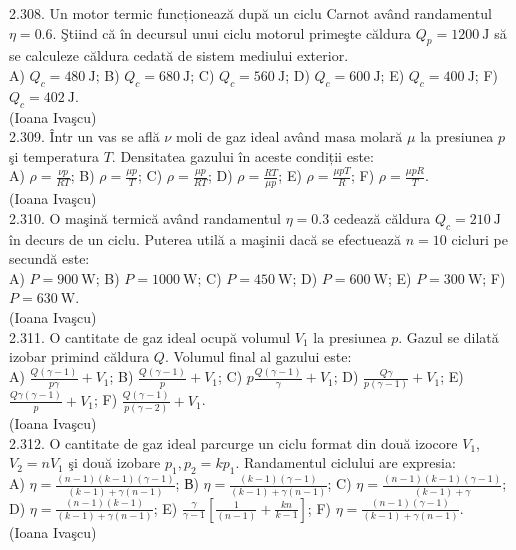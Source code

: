 \documentclass[10pt]{article}
\begin{document}
2.308. Un motor termic funcționează după un ciclu Carnot având randamentul $\eta=0.6$. Ştiind că în decursul unui ciclu motorul primeşte căldura $Q_{p}=1200 \mathrm{~J}$ să se calculeze căldura cedată de sistem mediului exterior.\\ A) $Q_{c}=480 \mathrm{~J}$; B) $Q_{c}=680 \mathrm{~J}$; C) $Q_{c}=560 \mathrm{~J}$; D) $Q_{c}=600 \mathrm{~J}$; E) $Q_{c}=400 \mathrm{~J}$; F) $Q_{c}=402 \mathrm{~J}$.\\ (Ioana Ivaşcu)\\

2.309. Într un vas se află $\nu$ moli de gaz ideal având masa molară $\mu$ la presiunea $p$ şi temperatura $T$. Densitatea gazului în aceste condiții este:\\ A) $\rho=\frac{\nu p}{R T}$; B) $\rho=\frac{\mu p}{T}$; C) $\rho=\frac{\mu p}{R T}$; D) $\rho=\frac{R T}{\mu p}$; E) $\rho=\frac{\mu p T}{R}$; F) $\rho=\frac{\mu p R}{T}$.\\ (Ioana Ivaşcu)\\

2.310. O maşină termică având randamentul $\eta=0.3$ cedează căldura $Q_{c}=210 \mathrm{~J}$ în decurs de un ciclu. Puterea utilă a maşinii dacă se efectuează $n=10$ cicluri pe secundă este:\\ A) $P=900 \mathrm{~W}$; B) $P=1000 \mathrm{~W}$; C) $P=450 \mathrm{~W}$; D) $P=600 \mathrm{~W}$; E) $P=300 \mathrm{~W}$; F) $P=630 \mathrm{~W}$.\\ (Ioana Ivaşcu)\\

2.311. O cantitate de gaz ideal ocupă volumul $V_{1}$ la presiunea $p$. Gazul se dilată izobar primind căldura $Q$. Volumul final al gazului este:\\ A) $\frac{Q(\gamma-1)}{p \gamma}+V_{1}$; B) $\frac{Q(\gamma-1)}{p}+V_{1}$; C) $p \frac{Q(\gamma-1)}{\gamma}+V_{1}$; D) $\frac{Q \gamma}{p(\gamma-1)}+V_{1}$; E) $\frac{Q \gamma(\gamma-1)}{p}+V_{1}$; F) $\frac{Q(\gamma-1)}{p(\gamma-2)}+V_{1}$.\\ (Ioana Ivaşcu)\\

2.312. O cantitate de gaz ideal parcurge un ciclu format din două izocore $V_{1}$, $V_{2}=n V_{1}$ şi două izobare $p_{1}, p_{2}=k p_{1}$. Randamentul ciclului are expresia:\\ A) $\eta=\frac{(n-1)(k-1)(\gamma-1)}{(k-1)+\gamma(n-1)}$; В) $\eta=\frac{(k-1)(\gamma-1)}{(k-1)+\gamma(n-1)}$; C) $\eta=\frac{(n-1)(k-1)(\gamma-1)}{(k-1)+\gamma}$; D) $\eta=\frac{(n-1)(k-1)}{(k-1)+\gamma(n-1)}$; E) $\frac{\gamma}{\gamma-1}\left[\frac{1}{(n-1)}+\frac{k n}{k-1}\right]$; F) $\eta=\frac{(n-1)(\gamma-1)}{(k-1)+\gamma(n-1)}$.\\ (Ioana Ivaşcu)\\
\end{document}
